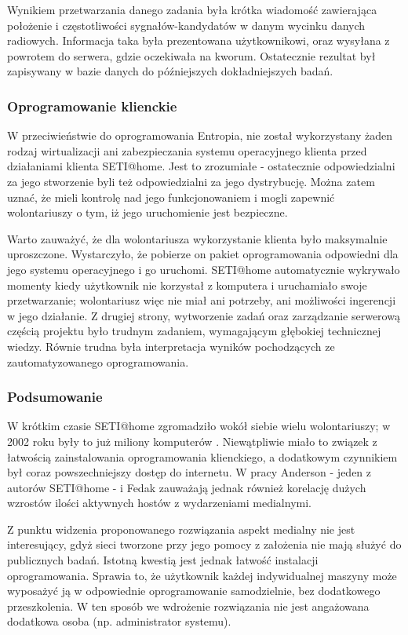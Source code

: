 \documentclass[12pt,a4paper,twoside]{article}
\begin{document}
Wynikiem przetwarzania danego zadania była krótka wiadomość zawierająca położenie i częstotliwości sygnałów-kandydatów w danym wycinku danych radiowych. Informacja taka była prezentowana użytkownikowi, oraz wysyłana z powrotem do serwera, gdzie oczekiwała na kworum. Ostatecznie rezultat był zapisywany w bazie danych do późniejszych dokładniejszych badań.

\subsubsection{Oprogramowanie klienckie}

W przeciwieństwie do oprogramowania Entropia, nie został wykorzystany żaden rodzaj wirtualizacji ani zabezpieczania systemu operacyjnego klienta przed działaniami klienta SETI@home. Jest to zrozumiałe - ostatecznie odpowiedzialni za jego stworzenie byli też odpowiedzialni za jego dystrybucję. Można zatem uznać, że mieli kontrolę nad jego funkcjonowaniem i mogli zapewnić wolontariuszy o tym, iż jego uruchomienie jest bezpieczne.

Warto zauważyć, że dla wolontariusza wykorzystanie klienta było maksymalnie uproszczone. Wystarczyło, że pobierze on pakiet oprogramowania odpowiedni dla jego systemu operacyjnego i go uruchomi. SETI@home automatycznie wykrywało momenty kiedy użytkownik nie korzystał z komputera i uruchamiało swoje przetwarzanie; wolontariusz więc nie miał ani potrzeby, ani możliwości ingerencji w jego działanie. Z drugiej strony, wytworzenie zadań oraz zarządzanie serwerową częścią projektu było trudnym zadaniem, wymagającym głębokiej technicznej wiedzy. Równie trudna była interpretacja wyników pochodzących ze zautomatyzowanego oprogramowania.

\subsubsection{Podsumowanie}

W krótkim czasie SETI@home zgromadziło wokół siebie wielu wolontariuszy; w 2002 roku były to już miliony komputerów \cite{seti}. Niewątpliwie miało to związek z łatwością zainstalowania oprogramowania klienckiego, a dodatkowym czynnikiem był coraz powszechniejszy dostęp do internetu. W pracy \cite{computational} Anderson - jeden z autorów SETI@home - i Fedak zauważają jednak również korelację dużych wzrostów ilości aktywnych hostów z wydarzeniami medialnymi.

Z punktu widzenia proponowanego rozwiązania aspekt medialny nie jest interesujący, gdyż sieci tworzone przy jego pomocy z założenia nie mają służyć do publicznych badań. Istotną kwestią jest jednak łatwość instalacji oprogramowania. Sprawia to, że użytkownik każdej indywidualnej maszyny może wyposażyć ją w odpowiednie oprogramowanie samodzielnie, bez dodatkowego przeszkolenia. W ten sposób we wdrożenie rozwiązania nie jest angażowana dodatkowa osoba (np. administrator systemu).
\end{document}
